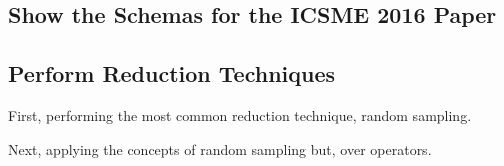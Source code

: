 \documentclass[]{article}
\newenvironment{Shaded}{}{}
\newcommand{\KeywordTok}[1]{\textcolor[rgb]{0.00,0.44,0.13}{\textbf{{#1}}}}
\newcommand{\StringTok}[1]{\textcolor[rgb]{0.25,0.44,0.63}{{#1}}}
\newcommand{\NormalTok}[1]{{#1}}
\begin{document}
\subsection{Show the Schemas for the ICSME 2016
Paper}\label{show-the-schemas-for-the-icsme-2016-paper}

\begin{Shaded}
\end{Shaded}

\subsection{Perform Reduction
Techniques}\label{perform-reduction-techniques}

First, performing the most common reduction technique, random sampling.

\begin{Shaded}
\end{Shaded}

Next, applying the concepts of random sampling but, over operators.

\begin{Shaded}
\end{Shaded}
\end{document}
